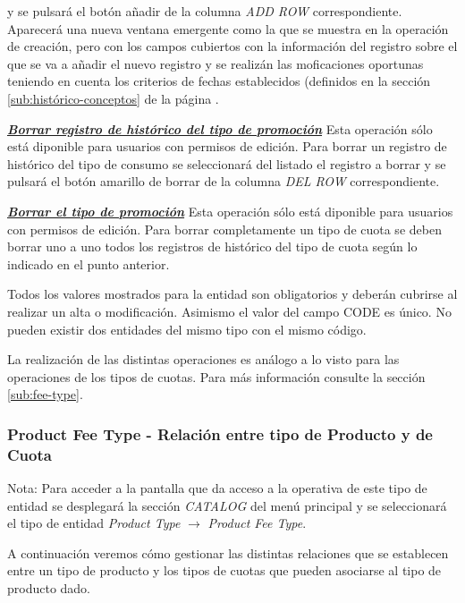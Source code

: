 y se pulsará el botón añadir de la columna \textit{ADD ROW} correspondiente. Aparecerá una nueva ventana emergente como la que se muestra en la operación de creación, pero con los campos cubiertos con la información del registro sobre el que se va a añadir el nuevo registro y se realizán las moficaciones oportunas teniendo en cuenta los criterios de fechas establecidos (definidos en la sección \ref{sub:histórico-conceptos} de la página \pageref{sub:histórico-conceptos}.

\underline{\textsl{\textbf{Borrar registro de histórico del tipo de promoción}}}\newline
Esta operación sólo está diponible para usuarios con permisos de edición.
Para borrar un registro de histórico del tipo de consumo se seleccionará del listado el registro a borrar y se pulsará el botón amarillo de borrar de la columna \textit{DEL ROW} correspondiente.\newline

\underline{\textsl{\textbf{Borrar el tipo de promoción}}}\newline
Esta operación sólo está diponible para usuarios con permisos de edición.
Para borrar completamente un tipo de cuota se deben borrar uno a uno todos los registros de histórico del tipo de cuota según lo indicado en el punto anterior. 

Todos los valores mostrados para la entidad son obligatorios y deberán cubrirse al realizar un alta o modificación. Asimismo el valor del campo CODE es único. No pueden existir dos entidades del mismo tipo con el mismo código.

La realización de las distintas operaciones es análogo a lo visto para las operaciones de los tipos de cuotas. Para más información consulte la sección \ref{sub:fee-type}.


\subsubsection{Product Fee Type - Relación entre tipo de Producto y de Cuota}
\label{sub:product-fee-type-relation}

Nota: Para acceder a la pantalla que da acceso a la operativa de este tipo de entidad se desplegará la sección \emph{CATALOG} del menú principal y se seleccionará el tipo de entidad \emph{Product Type} $\rightarrow$  \emph{Product Fee Type}.


A continuación veremos cómo gestionar las distintas relaciones que se establecen entre un tipo de producto y los tipos de cuotas que pueden asociarse al tipo de producto dado.


